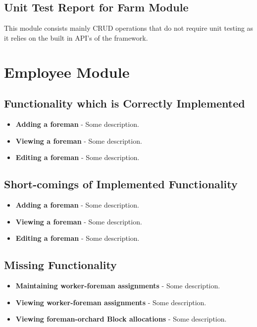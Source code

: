 \documentclass[11pt,fleqn]{book} %
\begin{document}
		\subsection{Unit Test Report for Farm Module}
			This module consists mainly CRUD operations that do not require unit testing as it relies on the built in API's of the framework.
	\section{Employee Module}
		\subsection{Functionality which is Correctly Implemented}
			\begin{itemize}
				\item\textbf{Adding a foreman} -
				Some description. 
				
				\item\textbf{Viewing a foreman} -
				Some description.
				
				\item\textbf{Editing a foreman} -
				Some description.
			\end{itemize}
		\subsection{Short-comings of Implemented Functionality}
			\begin{itemize}
				\item\textbf{Adding a foreman} -
				Some description. 
				
				\item\textbf{Viewing a foreman} -
				Some description.
				
				\item\textbf{Editing a foreman} -
				Some description.
			\end{itemize}
		\subsection{Missing Functionality}
			\begin{itemize}
				\item\textbf{Maintaining worker-foreman assignments} -
				Some description.
				
				\item\textbf{Viewing worker-foreman assignments} -
				Some description.
				
				\item\textbf{Viewing foreman-orchard Block allocations} -
				Some description.
			\end{itemize}
\end{document}

